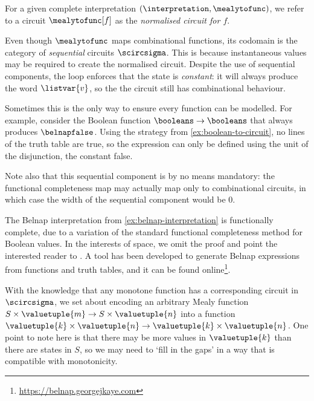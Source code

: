 \documentclass{lmcs}
\begin{document}
For a given complete interpretation \((\interpretation,\mealytofunc)\), we refer
to a circuit \(\mealytofunc[f]\) as the \emph{normalised circuit for \(f\)}.\

\begin{rem}
    Even though \(\mealytofunc\) maps combinational functions, its codomain is
    the category of \emph{sequential} circuits \(\scircsigma\).
    This is because instantaneous values may be required to create the
    normalised circuit.
    Despite the use of sequential components, the loop enforces that the state
    is \emph{constant}: it will always produce the word \(\listvar{v}\), so the
    the circuit still has combinational behaviour.

    Sometimes this is the only way to ensure every function can be modelled.
    For example, consider the Boolean function \(\booleans \to \booleans\) that
    always produces \(\belnapfalse\).
    Using the strategy from \autoref{ex:boolean-to-circuit}, no lines of the truth
    table are true, so the expression can only be defined using the unit of the
    disjunction, the constant false.

    Note also that this sequential component is by no means mandatory: the
    functional completeness map may actually map only to combinational circuits,
    in which case the width of the sequential component would be \(0\).
\end{rem}

\begin{exa}
    The Belnap interpretation from \autoref{ex:belnap-interpretation} is
    functionally complete, due to a variation of the standard functional
    completeness method for Boolean values.
    In the interests of space, we omit the proof and point the interested reader
    to \cite[Sec.\ 4.5]{kaye2025foundations}.
    A tool has been developed to generate Belnap expressions from functions
    and truth tables, and it can be found
    online\footnote{\url{https://belnap.georgejkaye.com}}.
\end{exa}

With the knowledge that any monotone function has a corresponding circuit
in \(\scircsigma\), we set about encoding an arbitrary Mealy function
\(S \times \valuetuple{m} \to S \times \valuetuple{n}\) into a function
\(\valuetuple{k} \times \valuetuple{n} \to \valuetuple{k} \times \valuetuple{n}\).
One point to note here is that there may be more values in \(\valuetuple{k}\)
than there are states in \(S\), so we may need to `fill in the gaps' in a way
that is compatible with monotonicity.
\end{document}
